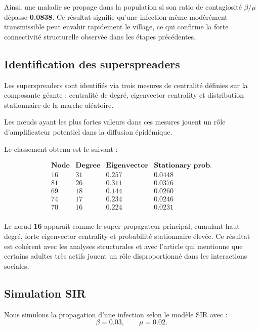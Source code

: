 \documentclass[10pt,twocolumn]{article}
\begin{document}
Ainsi, une maladie se propage dans la population si son ratio
de contagiosité $\beta/\mu$ dépasse \textbf{0.0838}.  
Ce résultat signifie qu’une infection même modérément transmissible
peut envahir rapidement le village, ce qui confirme la forte connectivité
structurelle observée dans les étapes précédentes.

\subsection{Identification des superspreaders}

Les superspreaders sont identifiés via trois mesures de centralité définies
sur la composante géante : centralité de degré, eigenvector centrality
et distribution stationnaire de la marche aléatoire.

Les nœuds ayant les plus fortes valeurs dans ces mesures jouent un rôle
d’amplificateur potentiel dans la diffusion épidémique.

Le classement obtenu est le suivant  :

\[
\begin{array}{c|c|c|c}
\textbf{Node} & \textbf{Degree} & \textbf{Eigenvector} & \textbf{Stationary prob.} \\
\hline
16 & 31 & 0.257 & 0.0448 \\
81 & 26 & 0.311 & 0.0376 \\
69 & 18 & 0.144 & 0.0260 \\
74 & 17 & 0.234 & 0.0246 \\
70 & 16 & 0.224 & 0.0231 \\
\end{array}
\]

Le nœud \textbf{16} apparaît comme le super-propagateur principal, cumulant
haut degré, forte eigenvector centrality et probabilité stationnaire élevée.
Ce résultat est cohérent avec les analyses structurales et avec l’article qui
mentionne que certains adultes très actifs jouent un rôle disproportionné
dans les interactions sociales.


\subsection{Simulation SIR}

Nous simulons la propagation d’une infection selon le modèle SIR avec :
\[
\beta = 0.03, \qquad \mu = 0.02.
\]
\end{document}
